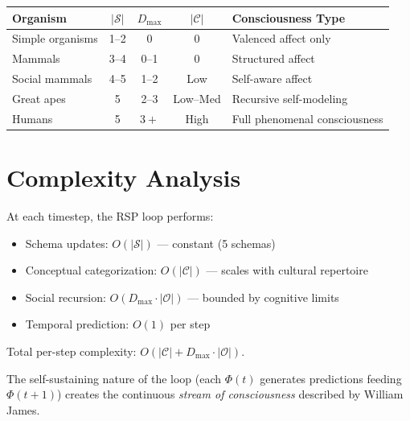\documentclass[11pt]{article}
\begin{document}
\begin{center}
\begin{tabular}{l c c c l}
\hline
\textbf{Organism} & \textbf{$|\mathcal{S}|$} & \textbf{$D_{\max}$} & \textbf{$|\mathcal{C}|$} & \textbf{Consciousness Type} \\
\hline
Simple organisms & 1--2 & 0 & 0 & Valenced affect only \\
Mammals & 3--4 & 0--1 & 0 & Structured affect \\
Social mammals & 4--5 & 1--2 & Low & Self-aware affect \\
Great apes & 5 & 2--3 & Low--Med & Recursive self-modeling \\
Humans & 5 & $3+$ & High & Full phenomenal consciousness \\
\hline
\end{tabular}
\end{center}

\section{Complexity Analysis}

At each timestep, the RSP loop performs:
\begin{itemize}
    \item Schema updates: $O(|\mathcal{S}|)$ --- constant (5 schemas)
    \item Conceptual categorization: $O(|\mathcal{C}|)$ --- scales with cultural repertoire
    \item Social recursion: $O(D_{\max} \cdot |\mathcal{O}|)$ --- bounded by cognitive limits
    \item Temporal prediction: $O(1)$ per step
\end{itemize}

Total per-step complexity: $O(|\mathcal{C}| + D_{\max} \cdot |\mathcal{O}|)$.

The self-sustaining nature of the loop (each $\Phi(t)$ generates predictions feeding $\Phi(t+1)$) creates the continuous \emph{stream of consciousness} described by William James.
\end{document}
